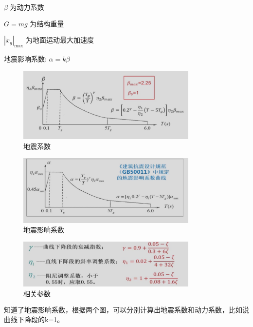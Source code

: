 \documentclass[12pt, a4paper, oneside, UTF8]{ctexbook}
\begin{document}
\( \beta \) 为动力系数

\( G = mg \) 为结构重量

\(\left| \ddot{x}_g \right|_{\text{max}}\) 为地面运动最大加速度

\begin{remark}
    地震影响系数: $\alpha = k\beta$
\end{remark}

\begin{figure}[H]
    \centering
    \includegraphics[width=0.8\textwidth]{../figure/beta.png}
    \caption{地震系数}
\end{figure}

\begin{figure}[H]
    \centering
    \includegraphics[width=0.8\textwidth]{../figure/alpha.png}
    \caption{地震影响系数}
\end{figure}

\begin{figure}[H]
    \centering
    \includegraphics[width=0.8\textwidth]{../figure/canshu.png}
    \caption{相关参数}
\end{figure}

\begin{remark}
    知道了地震影响系数，根据两个图，可以分别计算出地震系数和动力系数，比如说曲线下降段的k=1。
\end{remark}
\end{document}

